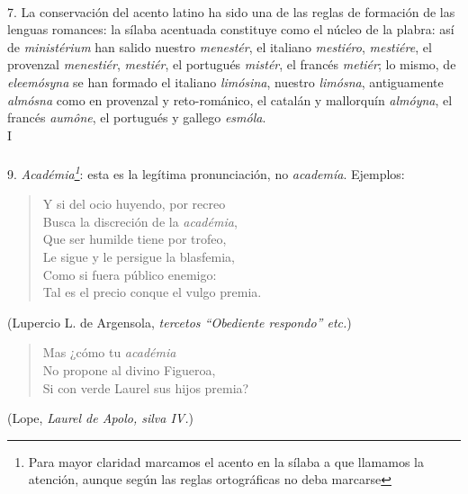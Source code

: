\documentclass{article}
\begin{document}
\small

\paragraph{} 7. La conservación del acento latino ha sido una de las reglas de formación de las lenguas 
romances: la sílaba acentuada constituye como el núcleo de la plabra: así de \emph{ministérium} han 
salido nuestro \emph{menestér}, el italiano \emph{mestiéro}, \emph{mestiére}, el provenzal 
\emph{menestiér}, \emph{mestiér}, el portugués \emph{mistér}, el francés \emph{metiér}; lo mismo, de
\emph{eleemósyna} se han formado el italiano \emph{limósina}, nuestro \emph{limósna}, antiguamente 
\emph{almósna} como en provenzal y reto-románico, el catalán y mallorquín \emph{almóyna}, el francés
\emph{aumône}, el portugués y gallego \emph{esmóla}.
\\

I

\normalsize

\paragraph{} 9. \emph{Académia\footnote{Para mayor claridad marcamos el acento en la sílaba a que llamamos 
la atención, aunque según las reglas ortográficas no deba marcarse}}: esta es la legítima pronunciación, no \emph{academía}. Ejemplos:

\small

\begin{verse}
Y si del ocio huyendo, por recreo \\
Busca la discreción de la \emph{académia}, \\
Que ser humilde tiene por trofeo, \\
Le sigue y le persigue la blasfemia, \\
Como si fuera público enemigo: \\
Tal es el precio conque el vulgo premia. \\
\end{verse}
\begin{flushright}
(Lupercio L. de Argensola, \emph{tercetos ``Obediente respondo'' etc.})
\end{flushright}

\begin{verse}
Mas ¿cómo tu \emph{académia} \\
No propone al divino Figueroa, \\
Si con verde Laurel sus hijos premia?
\end{verse}
\begin{flushright}
(Lope, \emph{Laurel de Apolo, silva IV.})
\end{flushright}
\end{document}
